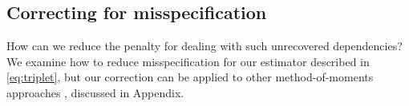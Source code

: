 
\vspace{-0.5em}
\subsection{Correcting for misspecification}\label{sec:misspec}
\vspace{-0.5em}
How can we reduce the penalty for dealing with such unrecovered dependencies? 
We examine how to reduce misspecification for our estimator described in \eqref{eq:triplet}, but our correction can be applied to other method-of-moments approaches \citep{anandkumar12, chaganty2014estimating}, discussed in Appendix. %


